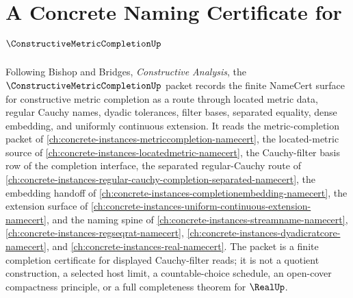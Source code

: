 \chapter{A Concrete Naming Certificate for $\ConstructiveMetricCompletionUp$}
\label{ch:concrete-instances-constructive-metric-completion-namecert}

Following Bishop and Bridges, \emph{Constructive Analysis}, the $\ConstructiveMetricCompletionUp$ packet records the finite NameCert surface for constructive metric completion as a route through located metric data, regular Cauchy names, dyadic tolerances, filter bases, separated equality, dense embedding, and uniformly continuous extension. It reads the metric-completion packet of \autoref{ch:concrete-instances-metriccompletion-namecert}, the located-metric source of \autoref{ch:concrete-instances-locatedmetric-namecert}, the Cauchy-filter basis row of the completion interface, the separated regular-Cauchy route of \autoref{ch:concrete-instances-regular-cauchy-completion-separated-namecert}, the embedding handoff of \autoref{ch:concrete-instances-completionembedding-namecert}, the extension surface of \autoref{ch:concrete-instances-uniform-continuous-extension-namecert}, and the naming spine of \autoref{ch:concrete-instances-streamname-namecert}, \autoref{ch:concrete-instances-regseqrat-namecert}, \autoref{ch:concrete-instances-dyadicratcore-namecert}, and \autoref{ch:concrete-instances-real-namecert}. The packet is a finite completion certificate for displayed Cauchy-filter reads; it is not a quotient construction, a selected host limit, a countable-choice schedule, an open-cover compactness principle, or a full completeness theorem for $\RealUp$.

